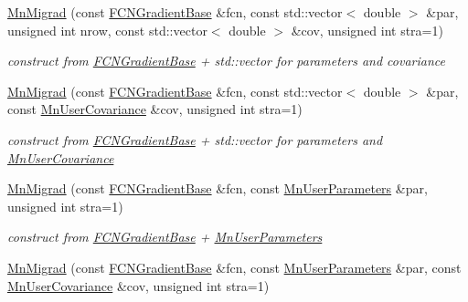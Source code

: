 \begin{DoxyCompactItemize}
\mbox{\hyperlink{classROOT_1_1Minuit2_1_1MnMigrad_a08924727b4a6e4fb5bd15816a88e5878}{Mn\+Migrad}} (const \mbox{\hyperlink{classROOT_1_1Minuit2_1_1FCNGradientBase}{F\+C\+N\+Gradient\+Base}} \&fcn, const std\+::vector$<$ double $>$ \&par, unsigned int nrow, const std\+::vector$<$ double $>$ \&cov, unsigned int stra=1)
\begin{DoxyCompactList}\small\item\em construct from \mbox{\hyperlink{classROOT_1_1Minuit2_1_1FCNGradientBase}{F\+C\+N\+Gradient\+Base}} + std\+::vector for parameters and covariance \end{DoxyCompactList}\item 
\mbox{\hyperlink{classROOT_1_1Minuit2_1_1MnMigrad_ae34b6d666b4a960bd1b382d5e574fa69}{Mn\+Migrad}} (const \mbox{\hyperlink{classROOT_1_1Minuit2_1_1FCNGradientBase}{F\+C\+N\+Gradient\+Base}} \&fcn, const std\+::vector$<$ double $>$ \&par, const \mbox{\hyperlink{classROOT_1_1Minuit2_1_1MnUserCovariance}{Mn\+User\+Covariance}} \&cov, unsigned int stra=1)
\begin{DoxyCompactList}\small\item\em construct from \mbox{\hyperlink{classROOT_1_1Minuit2_1_1FCNGradientBase}{F\+C\+N\+Gradient\+Base}} + std\+::vector for parameters and \mbox{\hyperlink{classROOT_1_1Minuit2_1_1MnUserCovariance}{Mn\+User\+Covariance}} \end{DoxyCompactList}\item 
\mbox{\hyperlink{classROOT_1_1Minuit2_1_1MnMigrad_ac31c890a07d2e2ca4b52feb5ece6fa3d}{Mn\+Migrad}} (const \mbox{\hyperlink{classROOT_1_1Minuit2_1_1FCNGradientBase}{F\+C\+N\+Gradient\+Base}} \&fcn, const \mbox{\hyperlink{classROOT_1_1Minuit2_1_1MnUserParameters}{Mn\+User\+Parameters}} \&par, unsigned int stra=1)
\begin{DoxyCompactList}\small\item\em construct from \mbox{\hyperlink{classROOT_1_1Minuit2_1_1FCNGradientBase}{F\+C\+N\+Gradient\+Base}} + \mbox{\hyperlink{classROOT_1_1Minuit2_1_1MnUserParameters}{Mn\+User\+Parameters}} \end{DoxyCompactList}\item 
\mbox{\hyperlink{classROOT_1_1Minuit2_1_1MnMigrad_a1c12d5f8210b36cdc555b341f6005c8d}{Mn\+Migrad}} (const \mbox{\hyperlink{classROOT_1_1Minuit2_1_1FCNGradientBase}{F\+C\+N\+Gradient\+Base}} \&fcn, const \mbox{\hyperlink{classROOT_1_1Minuit2_1_1MnUserParameters}{Mn\+User\+Parameters}} \&par, const \mbox{\hyperlink{classROOT_1_1Minuit2_1_1MnUserCovariance}{Mn\+User\+Covariance}} \&cov, unsigned int stra=1)

\end{DoxyCompactItemize}
